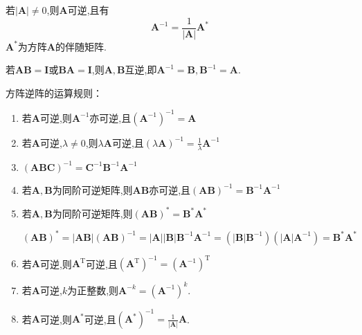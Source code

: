 \begin{ttheorem}
    若$\left\lvert \mathbf{A} \right\rvert\neq 0$,则$\mathbf{A}$可逆,且有
    \begin{equation*}
        \mathbf{A}^{-1}=\frac{1}{\left\lvert \mathbf{A} \right\rvert}\mathbf{A}^*
    \end{equation*}
    $\mathbf{A}^*$为方阵$\mathbf{A}$的伴随矩阵.
\end{ttheorem}

\begin{ttheorem}
    若$\mathbf{A}\mathbf{B}=\mathbf{I} $或$\mathbf{B}\mathbf{A}=\mathbf{I} $,则$\mathbf{A},\mathbf{B}$互逆,即$\mathbf{A}^{-1}=\mathbf{B},\mathbf{B}^{-1}=\mathbf{A}$.
\end{ttheorem}

方阵逆阵的运算规则：
\begin{enumerate}
    \item 若$\mathbf{A}$可逆,则$\mathbf{A}^{-1}$亦可逆,且$(\mathbf{A}^{-1})^{-1}=\mathbf{A}$
    \item 若$\mathbf{A}$可逆,$\lambda \neq 0$,则$\lambda \mathbf{A}$可逆,且$(\lambda \mathbf{A})^{-1}=\frac{1}{\lambda}\mathbf{A}^{-1}$
    \item $(\mathbf{A}\mathbf{B}\mathbf{C})^{-1}=\mathbf{C}^{-1}\mathbf{B}^{-1}\mathbf{A}^{-1}$
    \item 若$\mathbf{A},\mathbf{B}$为同阶可逆矩阵,则$\mathbf{A}\mathbf{B}$亦可逆,且$(\mathbf{A}\mathbf{B})^{-1}=\mathbf{B}^{-1}\mathbf{A}^{-1}$
    \item 若$\mathbf{A},\mathbf{B}$为同阶可逆矩阵,则$(\mathbf{A}\mathbf{B})^{*}=\mathbf{B}^{*}\mathbf{A}^{*}$
    
    \zheng $(\mathbf{A}\mathbf{B})^{*}=\left\lvert \mathbf{A}\mathbf{B}\right\rvert (\mathbf{A}\mathbf{B})^{-1}=\left\lvert \mathbf{A}\right\rvert \left\lvert \mathbf{B}\right\rvert \mathbf{B}^{-1}\mathbf{A}^{-1}=(\left\lvert \mathbf{B}\right\rvert \mathbf{B}^{-1})(\left\lvert \mathbf{A}\right\rvert \mathbf{A}^{-1})=\mathbf{B}^{*}\mathbf{A}^{*}$
    \item 若$\mathbf{A}$可逆,则$\mathbf{A}^\mathrm{T} $可逆,且$(\mathbf{A}^\mathrm{T})^{-1}=(\mathbf{A}^{-1})^\mathrm{T} $
    \item 若$\mathbf{A}$可逆,$k$为正整数,则$\mathbf{A}^{-k}=(\mathbf{A}^{-1})^k$.
    
    \item 若$\mathbf{A}$可逆,则$\mathbf{A}^*$可逆,且{\color{Blue}$(\mathbf{A}^*)^{-1}=\frac{1}{\left\lvert \mathbf{A} \right\rvert}\mathbf{A} $}.
    

\end{enumerate}
